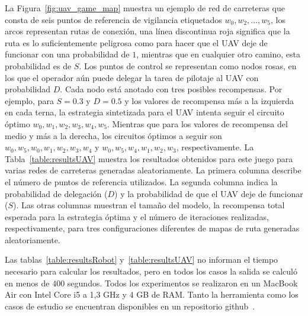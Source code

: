 %
La Figura~\ref{fig:uav_game_map} muestra un ejemplo de red de carreteras que consta de seis puntos de referencia de vigilancia etiquetados $w_0,w_2,...,w_5$, los arcos representan rutas de conexión, una línea discontinua roja significa que la ruta es lo suficientemente peligrosa como para hacer que el UAV deje de funcionar con una probabilidad de $1$, mientras que en cualquier otro camino, esta probabilidad es de $S$. Los puntos de control se representan como nodos rosas, en los que el operador aún puede delegar la tarea de pilotaje al UAV con probabilidad $D$. Cada nodo está anotado con tres posibles recompensas. Por ejemplo, para $S=0.3$ y $D=0.5$ y los valores de recompensa más a la izquierda en cada terna, la estrategia sintetizada para el UAV intenta seguir el circuito óptimo $w_0,w_1,w_2,w_3,w_4,w_5$. Mientras que para los valores de recompensa del medio y más a la derecha, los circuitos óptimos a seguir son $w_0,w_5,w_0,w_1,w_2,w_3,w_4$ y $w_0,w_5,w_4,w_1,w_2,w_3$, respectivamente. 
La Tabla~\ref{table:resultsUAV} muestra los resultados obtenidos para este juego para varias redes de carreteras generadas aleatoriamente. La primera columna describe el número de puntos de referencia utilizados. La segunda columna indica la probabilidad de delegación ($D$) y la probabilidad de que el UAV deje de funcionar ($S$).
Las otras columnas muestran el tamaño del modelo, la recompensa total esperada para la estrategia óptima y el número de iteraciones realizadas, respectivamente, para tres configuraciones diferentes de mapas de ruta generadas aleatoriamente.

Las tablas~\ref{table:resultsRobot} y~\ref{table:resultsUAV} no informan el tiempo necesario para calcular los resultados, pero en todos los casos la salida se calculó en menos de 400 segundos. Todos los experimentos se realizaron en un MacBook Air con Intel Core i5 a 1,3 GHz y 4 GB de RAM. Tanto la herramienta como los casos de estudio se encuentran disponibles en un repositorio github~\cite{FairPrism}.

